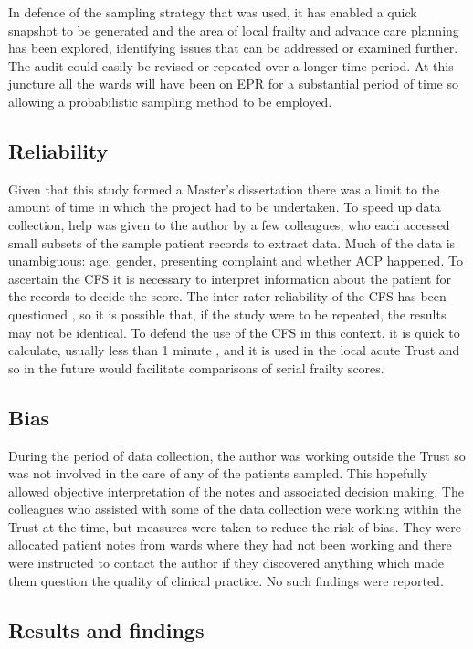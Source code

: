 \documentclass
[
	12pt,
	a4paper,
	oneside,
]{report}
\begin{document}
In defence of the sampling strategy that was used, it has enabled a quick 
snapshot to be generated and the area of local frailty and advance care planning
has been explored, identifying issues that can be
addressed or examined further. The audit could easily be revised or repeated 
over a longer time period. At this juncture all the wards 
will have been on EPR for a substantial period of time so
allowing a probabilistic sampling method to be employed.

\subsection{Reliability} 

Given that this study formed a Master's dissertation there was a limit to the
amount of time in which the project had to be undertaken. To speed up data 
collection, help was given to the author by a few
colleagues, who each accessed small subsets of the sample patient records to 
extract data. Much of the data is unambiguous: age, gender, presenting complaint
and whether ACP happened. To ascertain the CFS it is necessary to interpret 
information about the patient for the records to decide the score. The
inter-rater reliability of the CFS has been questioned \parencite{gilbert:18},
so it is possible that, 
if the study were to be repeated, the results may not be identical.
To defend the use of the CFS in this context, it is quick to calculate, usually 
less than 1 minute \parencite{elliott:17}, and it is used in the local acute
Trust and so in the future would facilitate comparisons of serial frailty
scores.

\subsection{Bias} 
During the period of data collection, the author was working outside the Trust 
so was not involved in the care of any of the patients sampled. This hopefully 
allowed objective interpretation of the notes and associated decision making.
The colleagues who assisted with some of the data collection were working 
within the Trust at the time, but measures were taken to reduce the risk of 
bias. They were allocated patient notes from wards where they had not been
working and there were instructed to contact the author if they discovered
anything which made them question the quality of clinical practice. No such
findings were reported.

\subsection{Results and findings}
\end{document}
